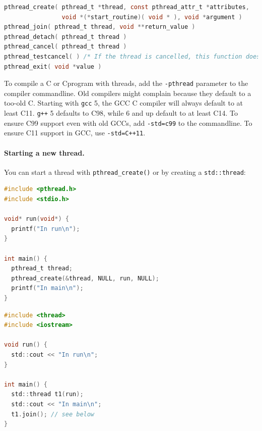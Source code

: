 \documentclass[a4paper]{report}
\newcommand{\CPP}{C\nolinebreak\hspace{-.05em}\raisebox{.4ex}{\tiny\bf +}\nolinebreak\hspace{-.10em}\raisebox{.4ex}{\tiny\bf +}}
\def\CPP{{C\nolinebreak[4]\hspace{-.05em}\raisebox{.4ex}{\tiny\bf ++}}}
\begin{document}
\begin{lstlisting}[language=C]
pthread_create( pthread_t *thread, const pthread_attr_t *attributes,
                void *(*start_routine)( void * ), void *argument )
pthread_join( pthread_t thread, void **return_value )
pthread_detach( pthread_t thread )
pthread_cancel( pthread_t thread )
pthread_testcancel( ) /* If the thread is cancelled, this function does not return (thread terminated) */
pthread_exit( void *value )
\end{lstlisting}

To compile a C or \CPP program with threads, add the {\tt -pthread}
parameter to the compiler commandline. Old compilers might complain
because they default to a too-old C. Starting with {\tt gcc} 5, the
GCC C compiler will always default to at least C11. {\tt g++} 5
defaults to \CPP 98, while 6 and up default to at least \CPP 14. To
ensure C99 support even with old GCCs, add \texttt{-std=c99} to the
commandline. To ensure \CPP11 support in GCC, use \verb!-std=C++11!.




\paragraph{Starting a new thread.} You can start a thread with
\verb+pthread_create()+ or by creating a \verb+std::thread+:

{\small
  \begin{minipage}{.55\textwidth}
\begin{lstlisting}[language=C]
#include <pthread.h>
#include <stdio.h>

void* run(void*) {
  printf("In run\n");
}

int main() {
  pthread_t thread;
  pthread_create(&thread, NULL, run, NULL);
  printf("In main\n");
}
\end{lstlisting}
  \end{minipage} 
  \begin{minipage}{.4\textwidth}
\begin{lstlisting}[language=C]
#include <thread>
#include <iostream>

void run() {
  std::cout << "In run\n";
}

int main() {
  std::thread t1(run);
  std::cout << "In main\n";
  t1.join(); // see below
}
\end{lstlisting}
  \end{minipage}
}
\end{document}
